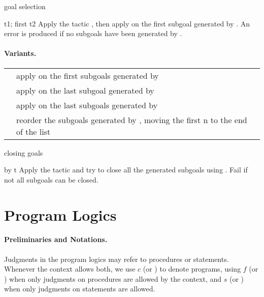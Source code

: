 \begin{tactic}[t1; first t2]{goal selection}
  \begin{tsyntax}[empty]{t1; first t2}
  Apply the tactic , then apply  on the first subgoal
  generated by . An error is produced if no subgoals have been
  generated by .

  \paragraph{Variants.}\strut

  \noindent\begin{tabularx}{\textwidth}{@{}ll@{}}
  {\ec{t1; first n t2}} & apply {\ec{t2}} on the first {\ec{n}} subgoals
    generated by {\ec{t1}}\\
  {\ec{t1; last t2}} & apply {\ec{t2}} on the last subgoal
    generated by {\ec{t1}}\\
  {\ec{t1; last n t2}} & apply {\ec{t2}} on the last {\ec{n}} subgoals
    generated by {\ec{t1}}\\
  {\ec{t; first n last}} & \parbox{200pt}{reorder the subgoals generated by {}, moving
    the first n to the end of the list}
  \end{tabularx}
  \end{tsyntax}
\end{tactic}

\begin{tactic}[by t]{closing goals}
  \begin{tsyntax}[empty]{by t}
  Apply the tactic  and try to close all the generated subgoals using
  . Fail if not all subgoals can be closed.
  \end{tsyntax}
\end{tactic}

\section{Program Logics}

\paragraph{Preliminaries and Notations.}
Judgments in the program logics may refer to procedures or
statements. Whenever the context allows both, we use $c$ (or )
to denote programs, using $f$ (or ) when only judgments on
procedures are allowed by the context, and $s$ (or ) when only
judgments on statements are allowed.

